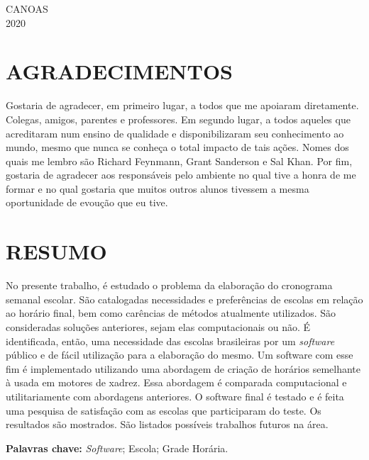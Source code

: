 \documentclass[12pt,a4paper]{article}
\newenvironment{bottompar}{\par\vspace*{\fill}}{\clearpage}
\begin{document}
	\begin{bottompar}
		\begin{center}
			CANOAS \\
			2020
		\end{center}
	\end{bottompar}


	\thispagestyle{empty}
	\section*{AGRADECIMENTOS}

	Gostaria de agradecer, em primeiro lugar, a todos que me apoiaram diretamente. Colegas, amigos, parentes e professores. Em segundo lugar, a todos aqueles que acreditaram num ensino de qualidade e disponibilizaram seu conhecimento ao mundo, mesmo que nunca se conheça o total impacto de tais ações. Nomes dos quais me lembro são Richard Feynmann, Grant Sanderson e Sal Khan. Por fim, gostaria de agradecer aos responsáveis pelo ambiente no qual tive a honra de me formar e no qual gostaria que muitos outros alunos tivessem a mesma oportunidade de evoução que eu tive.

	\newpage


	\thispagestyle{empty}
	\section*{RESUMO}

	No presente trabalho, é estudado o problema da elaboração do cronograma semanal escolar. São catalogadas necessidades e preferências de escolas em relação ao horário final, bem como carências de métodos atualmente utilizados. São consideradas soluções anteriores, sejam elas computacionais ou não. É identificada, então, uma necessidade das escolas brasileiras por um \textit{software} público e de fácil utilização para a elaboração do mesmo. Um software com esse fim é implementado utilizando uma abordagem de criação de horários semelhante à usada em motores de xadrez. Essa abordagem é comparada	computacional e utilitariamente com abordagens anteriores. O software final é testado e é feita uma pesquisa de satisfação com as escolas que participaram do teste. Os resultados são mostrados. São listados possíveis trabalhos futuros na área.


	\begingroup
		\setlength{\parindent}{0mm}
		\textbf{Palavras chave:} \textit{Software}; Escola; Grade Horária.
	\endgroup
	\newpage
\end{document}
